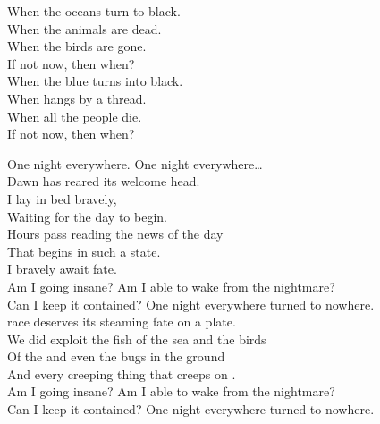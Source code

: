 When the oceans turn to black. \\
When the animals are dead. \\
When the birds are gone. \\
If not now, then when? \\

When the blue  turns into black. \\
When  hangs by a thread. \\
When all the people die. \\
If not now, then when? \\





One night everywhere. One night everywhere… \\

Dawn has reared its welcome head. \\
I lay in bed bravely, \\
Waiting for the day to begin. \\

Hours pass reading the news of the day \\
That begins in such a state. \\
I bravely await fate. \\

Am I going insane? Am I able to wake from the nightmare? \\
Can I keep it contained? One night everywhere turned to nowhere. \\

 race deserves its steaming fate on a plate. \\
We did exploit the fish of the sea and the birds \\
Of the  and even the bugs in the ground \\
And every creeping thing that creeps on . \\

Am I going insane? Am I able to wake from the nightmare? \\
Can I keep it contained? One night everywhere turned to nowhere. \\


